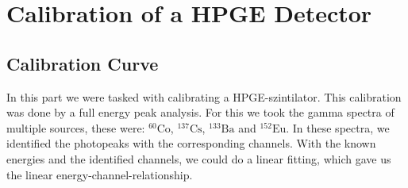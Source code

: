 \section{Calibration of a HPGE Detector}

\subsection{Calibration Curve}

In this part we were tasked with calibrating a HPGE-szintilator.
This calibration was done by a full energy peak analysis.
For this we took the gamma spectra of multiple sources, these were: $^{60}\text{Co}$, $^{137}\text{Cs}$, $^{133}\text{Ba}$ and $^{152}\text{Eu}$. 
In these spectra, we identified the photopeaks with the corresponding channels.
With the known energies and the identified channels, we could do a linear fitting, which gave us the linear energy-channel-relationship.

